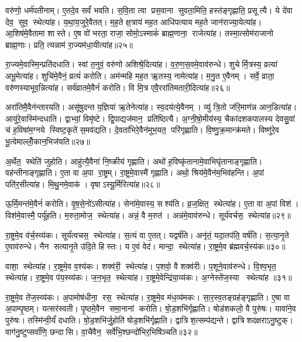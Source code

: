 वरु॑णो॒ धर्म॑पतीनाम्।
ए॒तदे॒व सर्वं॑ भवति।
स॒वि॒ता त्वा प्रस॒वाना सुवता॒मिति॒ हस्त॑ङ्गृह्णाति॒ प्रसूत्यै।
ये दे॑वा देव॒ सुव॒ स्थेत्या॑ह।
य॒था॒य॒जुरे॒वैतत्।
म॒ह॒ते क्ष॒त्राय॑ मह॒त आधि॑पत्याय मह॒ते जान॑राज्या॒येत्या॑ह।
आ॒शिष॑मे॒वैतामा शास्ते।
ए॒ष वो॑ भरता॒ राजा॒ सोमो॒ऽस्माकं॑ ब्राह्म॒णाना॒ राजेत्या॑ह।
तस्मा॒त्सोम॑राजानो ब्राह्म॒णाः।
प्रति॒ त्यन्नाम॑ रा॒ज्यम॑धा॒यीत्या॑ह॥२५॥

रा॒ज्यमे॒वास्मि॒न्प्रति॑दधाति।
स्वां त॒नुवं॒ वरु॑णो अशिश्रे॒दित्या॑ह।
व॒रु॒ण॒स॒वमे॒वाव॑रुन्धे।
शुचेर्मि॒त्रस्य॒ व्रत्या॑ अभू॒मेत्या॑ह।
शुचि॑मे॒वैनं॒ व्रत्यं॑ करोति।
अम॑न्महि मह॒त ऋ॒तस्य॒ नामेत्या॑ह।
म॒नु॒त ए॒वैनम्।
सर्वे॒ व्राता॒ वरु॑णस्याभूव॒न्नित्या॑ह।
सर्व॑व्रातमे॒वैनं॑ करोति।
वि मि॒त्र एवै॒ररा॑तिमतारी॒दित्या॑ह॥२६॥

अरा॑तिमै॒वैन॑न्तारयति।
असू॑षुदन्त य॒ज्ञिया॑ ऋ॒तेनेत्या॑ह।
स्व॒दय॑त्ये॒वैनम्।
व्यु॑ त्रि॒तो ज॑रि॒माण॑न्न आन॒डित्या॑ह।
आयु॑रे॒वास्मि॑न्दधाति।
द्वाभ्यां॒ विमृ॑ष्टे।
द्वि॒पाद्यज॑मान॒ प्रति॑ष्ठित्यै।
अ॒ग्नी॒षो॒मीय॑स्य॒ चैका॑दशकपालस्य देवसु॒वां च॑ ह॒विषा॑म॒ग्नये स्विष्ट॒कृते॑ स॒मव॑द्यति।
दे॒वता॑भिरे॒वैन॑मुभ॒यत॒ परि॑गृह्णाति।
वि॒ष्णु॒क्र॒मान्क्र॑मते।
विष्णु॑रे॒व भू॒त्वेमाल्लोँ॒कान॒भिज॑यति॥२७॥\anuvakamend[स॒त्याना॑मधा॒यीत्या॑हातारी॒दित्या॑ह क्रमत॒ एकं च]

अ॒र्थेत॒ स्थेति॑ जुहोति।
आहु॑त्यै॒वैना॑ नि॒ष्क्रीय॑ गृह्णाति।
अथो॑ ह॒विष्कृ॑तानामे॒वाभिघृ॑तानाङ्गृह्णाति।
वह॑न्तीनाङ्गृह्णाति।
ए॒ता वा अ॒पा रा॒ष्ट्रम्।
रा॒ष्ट्रमे॒वास्मै॑ गृह्णाति।
अथो॒ श्रिय॑मे॒वैन॑म॒भिव॑हन्ति।
अ॒पां पति॑र॒सीत्या॑ह।
मि॒थु॒नमे॒वाक॑।
वृषाऽस्यू॒र्मिरित्या॑ह॥२८॥

ऊ॒र्मि॒मन्त॑मे॒वैनं॑ करोति।
वृ॒ष॒से॒नो॑ऽसीत्या॑ह।
सेना॑मे॒वास्य॒ सश्य॑ति।
व्र॒ज॒क्षित॒ स्थेत्या॑ह।
ए॒ता वा अ॒पां विश॑।
विश॑मे॒वास्मै॒ पर्यू॑हति।
म॒रुता॒मोज॒ स्थेत्या॑ह।
अन्नं॒ वै म॒रुत॑।
अन्न॑मे॒वाव॑रुन्धे।
सूर्य॑वर्चस॒ स्थेत्या॑ह॥२९॥

रा॒ष्ट्रमे॒व व॑र्च॒स्व्य॑कः।
सूर्य॑त्वचस॒ स्थेत्या॑ह।
स॒त्यं वा ए॒तत्।
यद्वर्\mbox{}ष॑ति।
अनृ॑तं॒ यदा॒तप॑ति॒ वर्\mbox{}ष॑ति।
स॒त्या॒नृ॒ते ए॒वाव॑रुन्धे।
नैन सत्यानृ॒ते उ॑दि॒ते हिस्तः।
य ए॒वं वेद॑।
मान्दा॒ स्थेत्या॑ह।
रा॒ष्ट्रमे॒व ब्र॑ह्मवर्च॒स्य॑कः॥३०॥

वाशा॒ स्थेत्या॑ह।
रा॒ष्ट्रमे॒व व॒श्य॑कः।
शक्व॑री॒ स्थेत्या॑ह।
प॒शवो॒ वै शक्व॑रीः।
प॒शूने॒वाव॑रुन्धे।
वि॒श्व॒भृत॒ स्थेत्या॑ह।
रा॒ष्ट्रमे॒व प॑य॒स्व्य॑कः।
ज॒न॒भृत॒ स्थेत्या॑ह।
रा॒ष्ट्रमे॒वेन्द्रि॑या॒व्य॑कः।
अ॒ग्नेस्ते॑ज॒स्या स्थेत्या॑ह ॥३१॥

रा॒ष्ट्रमे॒व ते॑ज॒स्व्य॑कः।
अ॒पामोष॑धीना॒ रस॒ स्थेत्या॑ह।
रा॒ष्ट्रमे॒व म॑ध॒व्य॑मकः।
सा॒र॒स्व॒तङ्ग्रह॑ङ्गृह्णाति।
ए॒षा वा अ॒पाम्पृ॒ष्ठम्।
यत्सर॑स्वती।
पृ॒ष्ठमे॒वैन समा॒नानां करोति।
षो॒ड॒शभि॑र्गृह्णाति।
षोड॑शकलो॒ वै पुरु॑षः।
यावा॑ने॒व पुरु॑षः।
तस्मि॑न्वी॒र्यं॑ दधाति।
षो॒ड॒शभि॑र्जु॒होति॑ षोड॒शभि॑र्गृह्णाति।
द्वात्रिश॒त्सम्प॑द्यन्ते।
द्वात्रिशदक्षराऽनु॒ष्टुक्।
वाग॑नु॒ष्टुप्सर्वा॑णि॒ छन्दासि।
वा॒चैवैन॒ सर्वे॑भि॒श्छन्दो॑भिर॒भिषि॑ञ्चति॥३२॥\anuvakamend[ऊ॒र्मिरित्या॑ह॒ सूर्य॑वर्चस॒ स्थेत्या॑ह ब्रह्मवर्च॒स्य॑कस्तेज॒स्या स्थेत्या॑है॒व पुरु॑ष॒ष्षट् च॑]

